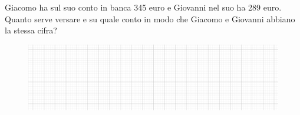 \item Giacomo ha sul suo conto in banca 345 euro e Giovanni nel suo ha 289 euro. Quanto serve versare e su quale conto in modo che Giacomo e Giovanni abbiano la stessa cifra?
\begin{figure}[h]
	\centering
		\includegraphics[width=13cm]{figure/quadretti.png}
\end{figure}
